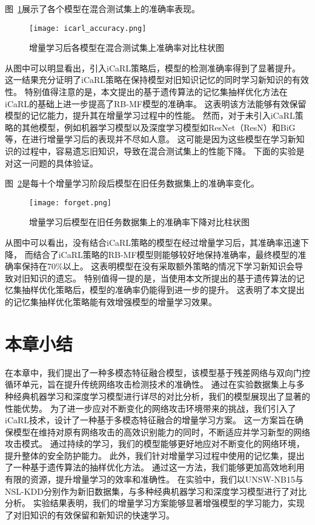 图~\ref{fig:acc_icarl}展示了各个模型在混合测试集上的准确率表现。
\begin{figure}[h]
	\centering
	\texttt{[image: icarl\_accuracy.png]}
	\caption{增量学习后各模型在混合测试集上准确率对比柱状图}
	\label{fig:acc_icarl}
\end{figure}
从图中可以明显看出，引入iCaRL策略后，模型的检测准确率得到了显著提升。
这一结果充分证明了iCaRL策略在保持模型对旧知识记忆的同时学习新知识的有效性。
特别值得注意的是，本文提出的基于遗传算法的记忆集抽样优化方法在iCaRL的基础上进一步提高了RB-MF模型的准确率。
这表明该方法能够有效保留模型的记忆能力，提升其在增量学习过程中的性能。
然而，对于未引入iCaRL策略的其他模型，例如机器学习模型以及深度学习模型如ResNet（ResN）和BiG等，在进行增量学习后的表现并不尽如人意。
这可能是因为这些模型在学习新知识的过程中，容易遗忘旧知识，导致在混合测试集上的性能下降。
下面的实验是对这一问题的具体验证。

图~\ref{fig:acc_forget}是每十个增量学习阶段后模型在旧任务数据集上的准确率变化。
\begin{figure}[h]
	\centering
	\texttt{[image: forget.png]}
	\caption{增量学习后模型在旧任务数据集上的准确率下降对比柱状图}
	\label{fig:acc_forget}
\end{figure}
\par
从图中可以看出，没有结合iCaRL策略的模型在经过增量学习后，其准确率迅速下降，
而结合了iCaRL策略的RB-MF模型则能够较好地保持准确率，最终模型的准确率保持在70\%以上。
这表明模型在没有采取额外策略的情况下学习新知识会导致对旧知识的遗忘。
特别值得一提的是，当使用本文所提出的基于遗传算法的记忆集抽样优化策略后，模型的准确率仍能得到进一步的提升。
这表明了本文提出的记忆集抽样优化策略能有效增强模型的增量学习效果。

\section{本章小结}
在本章中，我们提出了一种多模态特征融合模型，该模型基于残差网络与双向门控循环单元，旨在提升传统网络攻击检测技术的准确性。
通过在实验数据集上与多种经典机器学习和深度学习模型进行详尽的对比分析，我们的模型展现出了显著的性能优势。
为了进一步应对不断变化的网络攻击环境带来的挑战，我们引入了iCaRL技术，设计了一种基于多模态特征融合的增量学习方案。
这一方案旨在确保模型在维持对原有网络攻击的高效识别能力的同时，不断适应并学习新型的网络攻击模式。
通过持续的学习，我们的模型能够更好地应对不断变化的网络环境，提升整体的安全防护能力。
此外，我们针对增量学习过程中使用的记忆集，提出了一种基于遗传算法的抽样优化方法。
通过这一方法，我们能够更加高效地利用有限的资源，提升增量学习的效率和准确性。
在实验中，我们以UNSW-NB15与NSL-KDD分别作为新旧数据集，与多种经典机器学习和深度学习模型进行了对比分析。
实验结果表明，我们的增量学习方案能够显著增强模型的学习能力，实现了对旧知识的有效保留和新知识的快速学习。